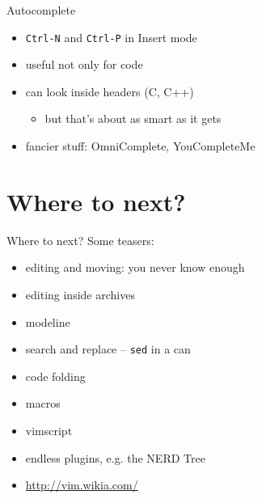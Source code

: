 \documentclass{beamer}
\begin{document}
\begin{frame}{Autocomplete}
  \begin{itemize}
    \item \texttt{Ctrl-N} and \texttt{Ctrl-P} in Insert mode
    \item useful not only for code
    \item can look inside headers (C, C++)
    \pause
      \begin{itemize}
        \item but that's about as smart as it gets
      \end{itemize}
    \pause
    \item fancier stuff: OmniComplete, YouCompleteMe
  \end{itemize}
\end{frame}

\section{Where to next?}
\begin{frame}{Where to next?}
  Some teasers:
  \begin{itemize}
    \item editing and moving: you never know enough
    \item editing inside archives
    \item modeline
    \item search and replace -- \texttt{sed} in a can
    \item code folding
    \item macros
    \item vimscript
    \item endless plugins, e.g. the NERD Tree
    \item \url{http://vim.wikia.com/}
  \end{itemize}
\end{frame}
\end{document}
